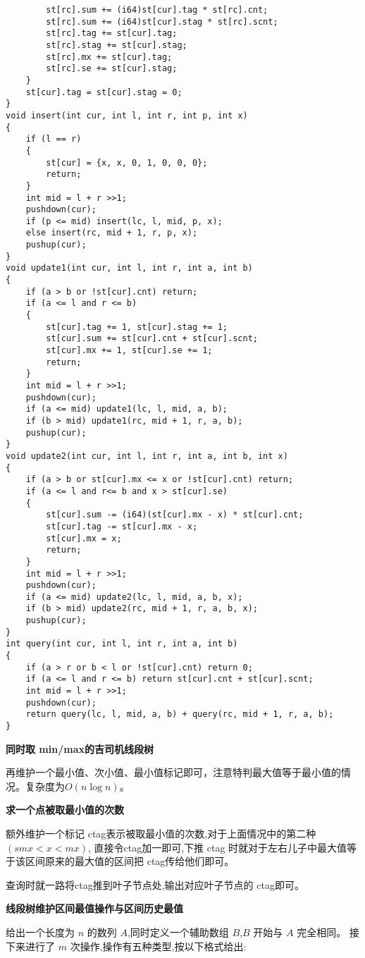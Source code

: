 \documentclass[a4paper, fontset=none]{ctexart}
\begin{document}
\begin{verbatim}
        st[rc].sum += (i64)st[cur].tag * st[rc].cnt;
        st[rc].sum += (i64)st[cur].stag * st[rc].scnt;
        st[rc].tag += st[cur].tag;
        st[rc].stag += st[cur].stag;
        st[rc].mx += st[cur].tag;
        st[rc].se += st[cur].stag;
    }
    st[cur].tag = st[cur].stag = 0;
}
void insert(int cur, int l, int r, int p, int x)
{
    if (l == r)
    {
        st[cur] = {x, x, 0, 1, 0, 0, 0};
        return;
    }
    int mid = l + r >>1;
    pushdown(cur);
    if (p <= mid) insert(lc, l, mid, p, x);
    else insert(rc, mid + 1, r, p, x);
    pushup(cur);
}
void update1(int cur, int l, int r, int a, int b)
{
    if (a > b or !st[cur].cnt) return;
    if (a <= l and r <= b)
    {
        st[cur].tag += 1, st[cur].stag += 1;
        st[cur].sum += st[cur].cnt + st[cur].scnt;
        st[cur].mx += 1, st[cur].se += 1;
        return;
    }
    int mid = l + r >>1;
    pushdown(cur);
    if (a <= mid) update1(lc, l, mid, a, b);
    if (b > mid) update1(rc, mid + 1, r, a, b);
    pushup(cur);
}
void update2(int cur, int l, int r, int a, int b, int x)
{
    if (a > b or st[cur].mx <= x or !st[cur].cnt) return;
    if (a <= l and r<= b and x > st[cur].se)
    {
        st[cur].sum -= (i64)(st[cur].mx - x) * st[cur].cnt;
        st[cur].tag -= st[cur].mx - x;
        st[cur].mx = x;
        return;
    }
    int mid = l + r >>1;
    pushdown(cur);
    if (a <= mid) update2(lc, l, mid, a, b, x);
    if (b > mid) update2(rc, mid + 1, r, a, b, x);
    pushup(cur);
}
int query(int cur, int l, int r, int a, int b)
{
    if (a > r or b < l or !st[cur].cnt) return 0;
    if (a <= l and r <= b) return st[cur].cnt + st[cur].scnt;
    int mid = l + r >>1;
    pushdown(cur);
    return query(lc, l, mid, a, b) + query(rc, mid + 1, r, a, b);
}
\end{verbatim}

\textbf{同时取 min/max的吉司机线段树}

再维护一个最小值、次小值、最小值标记即可，注意特判最大值等于最小值的情况。复杂度为$O(n\log n)$。

\textbf{求一个点被取最小值的次数}

额外维护一个标记 ctag表示被取最小值的次数,对于上面情况中的第二种$(smx < x<mx)$,
直接令ctag加一即可,下推 ctag 时就对于左右儿子中最大值等于该区间原来的最大值的区间把 
ctag传给他们即可。

查询时就一路将ctag推到叶子节点处,输出对应叶子节点的 ctag即可。

\textbf{线段树维护区间最值操作与区间历史最值}

给出一个长度为 $n$ 的数列 $A$,同时定义一个辅助数组 $B$,$B$ 开始与 $A$ 完全相同。
接下来进行了 $m$ 次操作,操作有五种类型,按以下格式给出:
\end{document}
